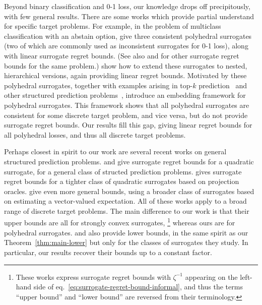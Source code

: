 \documentclass{article}
\theoremstyle{definition}\newtheorem{definition}{Definition}
\theoremstyle{definition}\newtheorem{assumption}{Assumption}
\begin{document}
Beyond binary classification and 0-1 loss, our knowledge drops off precipitously, with few general results.
There are some works which provide partial understand for specific target problems.
For example, in the problem of multiclass classification with an abstain option, \citet{ramaswamy2018consistent} give three consistent polyhedral surrogates (two of which are commonly used as inconsistent surrogates for 0-1 loss), along with linear surrogate regret bounds.
(See also \citet[Theorems 7 \& 8]{ni2019calibration} and \citet[Theorem 8]{charoenphakdee2021classification} for other surrogate regret bounds for the same problem.)
\citet{ramaswamy2015hierarchical} show how to extend these surrogates to nested, hierarchical versions, again providing linear regret bounds.
Motivated by these polyhedral surrogates, together with examples arising in top-$k$ prediction~\citep{lapin2016loss,yang2018consistency} and other structured prediction problems~\citep{yu2018lovasz}, \citet{finocchiaro2019embedding} introduce an embedding framework for polyhedral surrogates.
This framework shows that all polyhedral surrogates are consistent for some discrete target problem, and vice versa, but do not provide surrogate regret bounds.
Our results fill this gap, giving linear regret bounds for all polyhedral losses, and thus all discrete target problems.

Perhaps closest in spirit to our work are several recent works on general structured prediction problems.
\citet[Theorem 2]{ciliberto2016consistent} and \citet[Theorem 7]{osokin2017structured} give surrogate regret bounds for a quadratic surrogate, for a general class of structed prediction problems.
\citet[Proposition 5]{blondel2019structured} gives surrogate regret bounds for a tighter class of quadratic surrogates based on projection oracles.
\citet[Theorem 4.4]{nowak2019general} give even more general bounds, using a broader class of surrogates based on estimating a vector-valued expectation.
All of these works apply to a broad range of discrete target problems.
The main difference to our work is that their upper bounds are all for strongly convex surrogates,%
\footnote{These works express surrogate regret bounds with $\zeta^{-1}$ appearing on the left-hand side of eq.~\eqref{eq:surrogate-regret-bound-informal}, and thus the terms ``upper bound'' and ``lower bound'' are reversed from their terminology.}
whereas ours are for polyhedral surrogates.
\citet[Theorem 8]{osokin2017structured} and \citet[Theorem 4.5]{nowak2019general} also provide lower bounds, in the same spirit as our Theorem~\ref{thm:main-lower} but only for the classes of surrogates they study.
In particular, our results recover their bounds up to a constant factor.
\end{document}
